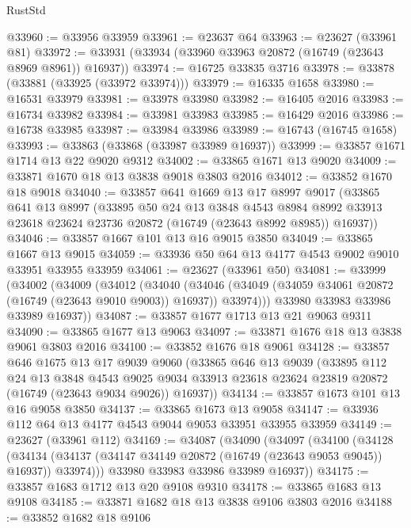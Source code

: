 \begin{lexlean}{RustStd}
\begin{coremodule}
@33960 := @33956 @33959
@33961 := @23637 @64
@33963 := @23627 (@33961 @81)
@33972 := @33931 (@33934 (@33960 @33963 @20872 (@16749 (@23643 @8969 @8961)) @16937))
@33974 := @16725 @33835 @3716
@33978 := @33878 (@33881 (@33925 (@33972 @33974)))
@33979 := @16335 @1658
@33980 := @16531 @33979
@33981 := @33978 @33980
@33982 := @16405 @2016
@33983 := @16734 @33982
@33984 := @33981 @33983
@33985 := @16429 @2016
@33986 := @16738 @33985
@33987 := @33984 @33986
@33989 := @16743 (@16745 @1658)
@33993 := @33863 (@33868 (@33987 @33989 @16937))
@33999 := @33857 @1671 @1714 @13 @22 @9020 @9312
@34002 := @33865 @1671 @13 @9020
@34009 := @33871 @1670 @18 @13 @3838 @9018 @3803 @2016
@34012 := @33852 @1670 @18 @9018
@34040 := @33857
    @641
    @1669
    @13
    @17
    @8997
    @9017
    (@33865
      @641
      @13
      @8997
      (@33895
        @50
        @24
        @13
        @3848
        @4543
        @8984
        @8992
        @33913
        @23618
        @23624
        @23736
        @20872
        (@16749 (@23643 @8992 @8985))
        @16937))
@34046 := @33857 @1667 @101 @13 @16 @9015 @3850
@34049 := @33865 @1667 @13 @9015
@34059 := @33936 @50 @64 @13 @4177 @4543 @9002 @9010 @33951 @33955 @33959
@34061 := @23627 (@33961 @50)
@34081 := @33999
    (@34002
      (@34009
        (@34012
          (@34040
            (@34046 (@34049 (@34059 @34061 @20872 (@16749 (@23643 @9010 @9003)) @16937)) @33974)))
        @33980
        @33983
        @33986
        @33989
        @16937))
@34087 := @33857 @1677 @1713 @13 @21 @9063 @9311
@34090 := @33865 @1677 @13 @9063
@34097 := @33871 @1676 @18 @13 @3838 @9061 @3803 @2016
@34100 := @33852 @1676 @18 @9061
@34128 := @33857
    @646
    @1675
    @13
    @17
    @9039
    @9060
    (@33865
      @646
      @13
      @9039
      (@33895
        @112
        @24
        @13
        @3848
        @4543
        @9025
        @9034
        @33913
        @23618
        @23624
        @23819
        @20872
        (@16749 (@23643 @9034 @9026))
        @16937))
@34134 := @33857 @1673 @101 @13 @16 @9058 @3850
@34137 := @33865 @1673 @13 @9058
@34147 := @33936 @112 @64 @13 @4177 @4543 @9044 @9053 @33951 @33955 @33959
@34149 := @23627 (@33961 @112)
@34169 := @34087
    (@34090
      (@34097
        (@34100
          (@34128
            (@34134 (@34137 (@34147 @34149 @20872 (@16749 (@23643 @9053 @9045)) @16937)) @33974)))
        @33980
        @33983
        @33986
        @33989
        @16937))
@34175 := @33857 @1683 @1712 @13 @20 @9108 @9310
@34178 := @33865 @1683 @13 @9108
@34185 := @33871 @1682 @18 @13 @3838 @9106 @3803 @2016
@34188 := @33852 @1682 @18 @9106

\end{coremodule}
\end{lexlean}
